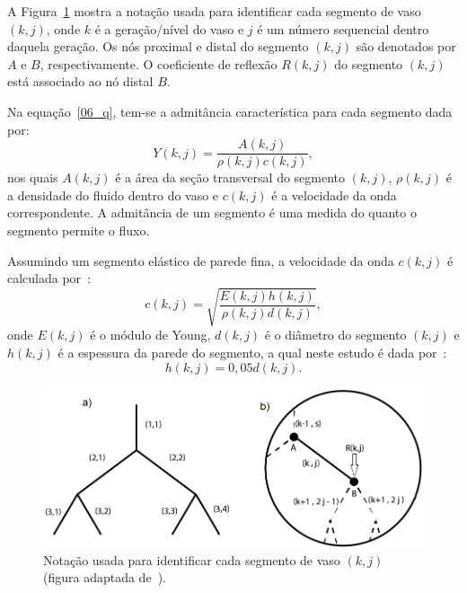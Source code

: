 \documentclass[
        english,			
        brazil			        %
        ,<...>]{abntbibufjf}
\begin{document}
A Figura~\ref{fig1:arterial-tree} mostra a notação usada para identificar cada segmento de vaso $(k,j)$, onde $k$ é a geração/nível do vaso e $j$ é um número sequencial dentro daquela geração. Os nós proximal e distal do segmento $(k,j)$ são denotados por $A$ e $B$, respectivamente. O coeficiente de reflexão $R(k,j)$ do segmento $(k,j)$ está associado ao nó distal $B$.

Na equação~\eqref{06_q}, tem-se a admitância característica para cada segmento dada por:
\begin{equation}
Y(k,j) = \frac{A(k,j)}{\rho(k,j)c(k,j)},
\label{eq:admitancia}
\end{equation}
nos quais $A(k,j)$ é a área da seção transversal do segmento $(k,j)$, $\rho(k,j)$ é a densidade do fluido dentro do vaso e $c(k,j)$ é a velocidade da onda correspondente. A admitância de um segmento é uma medida do quanto o segmento permite o fluxo.

Assumindo um segmento elástico de parede fina, a velocidade da onda $c(k,j)$ é calculada
por~\cite{Fung}:
\begin{equation}
c(k,j) = \sqrt{\frac{E(k,j) h(k,j)}{\rho(k,j) d(k,j)}},\label{eq:velocidade}
\end{equation}
onde $E(k,j)$ é o módulo de Young, $d(k,j)$ é o diâmetro do segmento $(k,j)$ e $h(k,j)$ é a espessura da parede do segmento, a qual neste estudo é dada por~\cite{Duan}: 
\begin{equation}
h(k,j) = 0,05 d(k,j).
\end{equation}

\begin{figure}[h] 
	\begin{center}
		\includegraphics[scale = 0.5]{Figures/ArterialTree_Zamir.png}%
		\caption{Notação usada para identificar cada segmento de vaso $(k,j)$ (figura adaptada de~\cite{Duan}). }
		\label{fig1:arterial-tree}%
	\end{center}
\end{figure}
\end{document}
